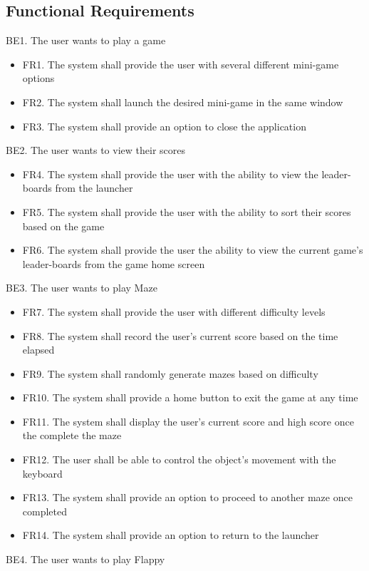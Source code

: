 \documentclass[12pt, titlepage]{article}
\begin{document}
\subsection{Functional Requirements}
    BE1. The user wants to play a game
    \begin{itemize}
    \item FR1. The system shall provide the user with several different mini-game options
    \item FR2. The system shall launch the desired mini-game in the same window
    \item FR3. The system shall provide an option to close the application
    \end{itemize}
    BE2. The user wants to view their scores
    \begin{itemize}
        \item FR4. The system shall provide the user with the ability to view the leader-boards from the launcher
        \item FR5. The system shall provide the user with the ability to sort their scores based on the game
        \item FR6. The system shall provide the user the ability to view the current game’s leader-boards from the game home screen
    \end{itemize}
    BE3. The user wants to play Maze
    \begin{itemize}
        \item FR7. The system shall provide the user with different difficulty levels
        \item FR8. The system shall record the user’s current score based on the time elapsed
        \item FR9. The system shall randomly generate mazes based on difficulty
        \item FR10. The system shall provide a home button to exit the game at any time
        \item FR11. The system shall display the user’s current score and high score once the complete the maze
        \item FR12. The user shall be able to control the object’s movement with the keyboard
        \item FR13. The system shall provide an option to proceed to another maze once completed
        \item FR14. The system shall provide an option to return to the launcher
    \end{itemize}
    BE4. The user wants to play Flappy
\end{document}
